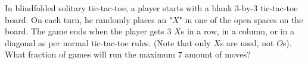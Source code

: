 In blindfolded solitary tic-tac-toe, a player starts with a blank $3$-by-$3$ tic-tac-toe board. On each turn, he randomly places an "$X$" in one of the open spaces on the board. The game ends when the player gets $3$ $X$s in a row, in a column, or in a diagonal as per normal tic-tac-toe rules. (Note that only $X$s are used, not $O$s). What fraction of games will run the maximum $7$ amount of moves?
